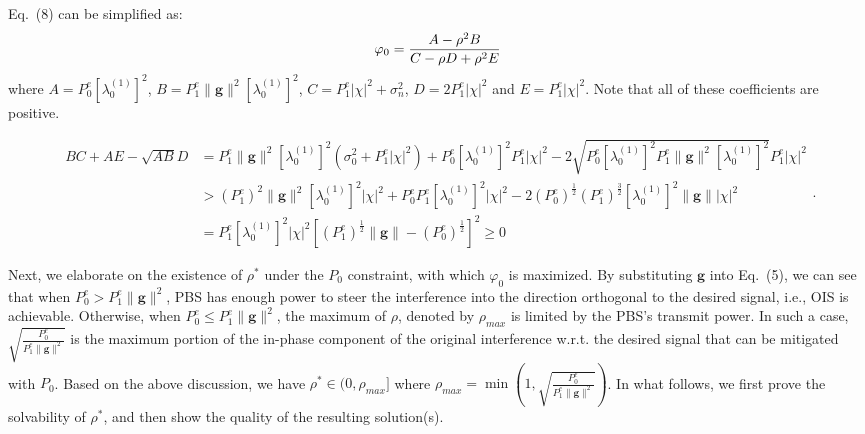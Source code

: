 \documentclass[10pt, conference, letterpaper]{IEEEtran}
\begin{document}
Eq.~(8) can be simplified as:
\begin{equation}
\vspace*{-0.05in}
\varphi_{0}=\frac{A-\rho^2 B}{C-\rho D+\rho^2 E}
\end{equation}
where $A=P^{e}_{0}[\lambda^{(1)}_{0}]^{2}$,
$B=P^{e}_{1}\|\mathbf{g}\|^{2}[\lambda^{(1)}_{0}]^{2}$,
$C=P^{e}_{1}|\chi|^{2}+\sigma^{2}_{n}$,
$D=2P^{e}_{1}|\chi|^{2}$ and $E=P^{e}_{1}|\chi|^{2}$.
Note that all of these coefficients are positive.
\begin{figure*}[hb]
\vspace*{-0.05in}
\setcounter{equation}{11}
\begin{equation}
\begin{aligned}
BC+AE-\sqrt{AB}D&=P^{e}_{1}\|\mathbf{g}\|^{2}[\lambda^{(1)}_{0}]^{2}(\sigma^{2}_{0}+P^{e}_{1}|\chi|^{2})
+P^{e}_{0}[\lambda^{(1)}_{0}]^{2}P^{e}_{1}|\chi|^{2}-2\sqrt{P^{e}_{0}[\lambda^{(1)}_{0}]^{2}P^{e}_{1}
\|\mathbf{g}\|^{2}[\lambda^{(1)}_{0}]^{2}}P^{e}_{1}|\chi|^{2}\\
&>(P^{e}_{1})^{2}\|\mathbf{g}\|^{2}[\lambda^{(1)}_{0}]^{2}|\chi|^{2}+P^{e}_{0}P^{e}_{1}[\lambda^{(1)}_{0}]^{2}
|\chi|^{2}-2(P^{e}_{0})^{\frac{1}{2}}(P^{e}_{1})^{\frac{3}{2}}[\lambda^{(1)}_{0}]^{2}\|\mathbf{g}\||\chi|^{2}\\
&=P^{e}_{1}[\lambda^{(1)}_{0}]^{2}|\chi|^{2}\left[(P^{e}_{1})^{\frac{1}{2}}\|\mathbf{g}\|-(P^{e}_{0})^{\frac{1}{2}}\right]^{2}\geq 0
\end{aligned}.
\end{equation}
\vspace*{-0.05in}
\end{figure*}

Next, we elaborate on the existence of $\rho^{*}$ under the $P_{0}$ constraint,
with which $\varphi_{0}$ is maximized.
By substituting $\mathbf{g}$ into Eq.~(5), we can see that
when $P^{e}_{0}>P^{e}_{1}\|\mathbf{g}\|^{2}$,
PBS has enough power to steer the interference into the direction orthogonal to the desired signal,
i.e., OIS is achievable.
Otherwise, when $P^{e}_{0}\leq P^{e}_{1}\|\mathbf{g}\|^{2}$,
the maximum of $\rho$, denoted by $\rho_{max}$ is limited by the PBS's transmit power.
In such a case, $\sqrt{\frac{P^{e}_{0}}{P^{e}_{1}\|\mathbf{g}\|^2}}$ is
the maximum portion of the in-phase component of the original interference w.r.t. the desired signal
that can be mitigated with $P_{0}$.
Based on the above discussion, we have $\rho^{*}\in (0,\rho_{max}]$ where
$\rho_{max}=\min\left(1,\sqrt{\frac{P^{e}_{0}}{P^{e}_{1}\|\mathbf{g}\|^2}}\right)$.
In what follows, we first prove the solvability of $\rho^{*}$,
and then show the quality of the resulting solution(s).
\end{document}

